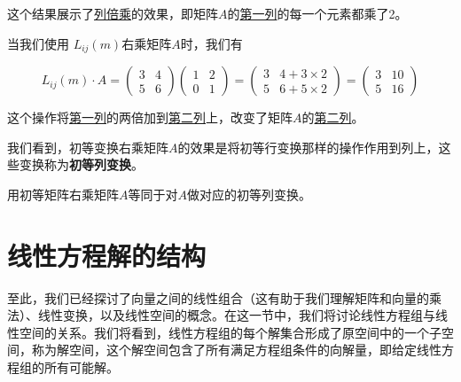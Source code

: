 \begin{exercise}
这个结果展示了\underline{列倍乘}的效果，即矩阵\(A\)的\underline{第一列}的每一个元素都乘了2。

当我们使用 $L_{ij}(m) $右乘矩阵\(A\)时，我们有

\[ L_{ij}(m) \cdot A = \begin{pmatrix} 3 & 4 \\ 5 & 6 \end{pmatrix} \begin{pmatrix} 1 & 2 \\ 0 & 1 \end{pmatrix} = \begin{pmatrix} 3 & 4 + 3 \times 2 \\ 5 & 6 + 5 \times 2 \end{pmatrix} = \begin{pmatrix} 3 & 10 \\ 5 & 16 \end{pmatrix} \]

这个操作将\underline{第一列}的两倍加到\underline{第二列}上，改变了矩阵\(A\)的\underline{第二列}。

\end{exercise}

我们看到，初等变换右乘矩阵$A$的效果是将初等行变换那样的操作作用到列上，这些变换称为\textcolor{third}{\bf 初等列变换}。

\vspace{0.2cm}

\begin{note}
    用初等矩阵右乘矩阵$A$等同于对$A$做对应的初等列变换。
\end{note}

\vspace{0.2cm}



\section{线性方程解的结构}
\label{sec:线性方程解的结构}

至此，我们已经探讨了向量之间的线性组合（这有助于我们理解矩阵和向量的乘法）、线性变换，以及线性空间的概念。在这一节中，我们将讨论线性方程组与线性空间的关系。我们将看到，线性方程组的每个解集合形成了原空间中的一个子空间，称为解空间，这个解空间包含了所有满足方程组条件的向解量，即给定线性方程组的所有可能解。


